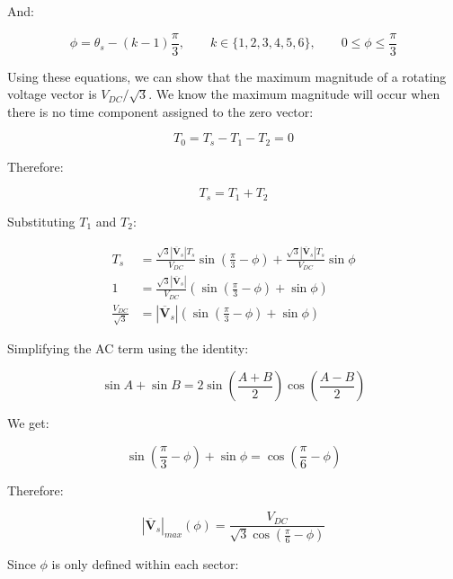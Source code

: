 \documentclass{article}
\begin{document}
And:

\begin{equation}
    \boxed{
    \phi = \theta_s - (k - 1)\frac{\pi}{3}, \qquad
    k \in \{1, 2, 3, 4, 5, 6\}, \qquad
    0 \leq \phi \leq \frac{\pi}{3}
    }
\end{equation}

Using these equations, we can show that the maximum magnitude of a rotating voltage vector is $V_{DC}/\sqrt{3}$. We know the maximum magnitude will occur when there is no time component assigned to the zero vector:

\begin{equation}
    T_0 = T_s - T_1 - T_2 = 0
\end{equation}

Therefore:

\begin{equation}
    T_s = T_1 + T_2
\end{equation}

Substituting $T_1$ and $T_2$:

\begin{align}
    T_s &= \frac{\sqrt{3}|\overline{\mathbf{V}}_s|T_s}{V_{DC}}\sin(\frac{\pi}{3} - \phi) + \frac{\sqrt{3}|\overline{\mathbf{V}}_s|T_s}{V_{DC}}\sin\phi \\
    1   &= \frac{\sqrt{3}|\overline{\mathbf{V}}_s|}{V_{DC}}(\sin(\frac{\pi}{3} - \phi) + \sin\phi) \\
    \frac{V_{DC}}{\sqrt{3}} &= |\overline{\mathbf{V}}_s|(\sin(\frac{\pi}{3} - \phi) + \sin\phi)
\end{align}

Simplifying the AC term using the identity:

\begin{equation}
    \sin A + \sin B = 2\sin\left(\frac{A + B}{2}\right)\cos\left(\frac{A - B}{2}\right)
\end{equation}

We get:

\begin{equation}
    \sin\left(\frac{\pi}{3} - \phi \right) + \sin\phi = \cos\left(\frac{\pi}{6} - \phi \right)
\end{equation}

Therefore:

\begin{equation}
    |\overline{\mathbf{V}}_s|_{max}(\phi) = \frac{V_{DC}}{\sqrt{3}\cos(\frac{\pi}{6} - \phi)}
\end{equation}

Since $\phi$ is only defined within each sector:
\end{document}
